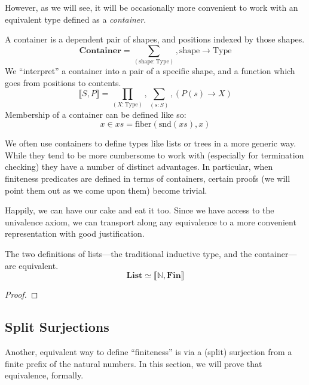 However, as we will see, it will be occasionally more convenient to work with an
equivalent type defined as a \emph{container}.
\begin{definition}[Container] \label{container-def}
  A container \cite{abbottContainersConstructingStrictly2005} is a dependent
  pair of shapes, and positions indexed by those shapes. 
  \begin{equation}
    \mathbf{Container} = \sum_{(\text{shape} : \text{Type})} , \text{shape} \rightarrow \text{Type}
  \end{equation}
  We ``interpret'' a container into a pair of a specific shape, and a function
  which goes from positions to contents.
  \begin{equation}
    \llbracket S , P \rrbracket = \prod_{(X : \text{Type})} , \sum_{(s : S)} , \left( P(s) \rightarrow X \right)
  \end{equation}
  Membership of a container can be defined like so:
  \begin{equation}
    x \in \mathit{xs} = \text{fiber}(\text{snd}(\mathit{xs}), x)
  \end{equation}
\end{definition}

We often use containers to define types like lists or trees in a more generic
way.
While they tend to be more cumbersome to work with (especially for termination
checking) they have a number of distinct advantages.
In particular, when finiteness predicates are defined in terms of containers,
certain proofs (we will point them out as we come upon them) become trivial.

Happily, we can have our cake and eat it too.
Since we have access to the univalence axiom, we can transport along any
equivalence to a more convenient representation with good justification.

\begin{lemma}
  The two definitions of lists---the traditional inductive type, and the
  container---are equivalent.
  \begin{equation}
    \mathbf{List} \simeq \llbracket \mathbb{N} , \mathbf{Fin} \rrbracket
  \end{equation}
\end{lemma}
\begin{proof}
\end{proof}

\subsection{Split Surjections}
Another, equivalent way to define ``finiteness'' is via a (split) surjection
from a finite prefix of the natural numbers.
In this section, we will prove that equivalence, formally.

